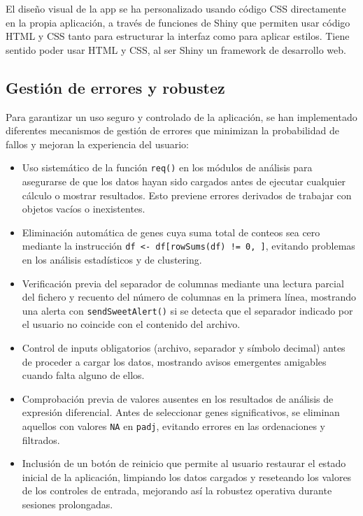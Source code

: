El diseño visual de la app se ha personalizado usando código CSS directamente en la propia aplicación, a
través de funciones de Shiny que permiten usar código HTML y CSS tanto para estructurar la interfaz como para aplicar estilos. Tiene sentido 
poder usar HTML y CSS, al ser Shiny un framework de desarrollo web.


\subsection{Gestión de errores y robustez}

Para garantizar un uso seguro y controlado de la aplicación, se han implementado diferentes mecanismos de gestión de errores que minimizan 
la probabilidad de fallos y mejoran la experiencia del usuario:

\begin{itemize}
    \item Uso sistemático de la función \texttt{req()} en los módulos de análisis para asegurarse de que los datos hayan sido cargados 
    antes de ejecutar cualquier cálculo o mostrar resultados. Esto previene errores derivados de trabajar con objetos vacíos o inexistentes.
    
    \item Eliminación automática de genes cuya suma total de conteos sea cero mediante la instrucción \texttt{df <- df[rowSums(df) != 0, ]}, 
    evitando problemas en los análisis estadísticos y de clustering.
    
    \item Verificación previa del separador de columnas mediante una lectura parcial del fichero y recuento del número de columnas en la 
    primera línea, mostrando una alerta con \texttt{sendSweetAlert()} si se detecta que el separador indicado por el usuario no coincide 
    con el contenido del archivo.
    
    \item Control de inputs obligatorios (archivo, separador y símbolo decimal) antes de proceder a cargar los datos, mostrando avisos 
    emergentes amigables cuando falta alguno de ellos.
    
    \item Comprobación previa de valores ausentes en los resultados de análisis de expresión diferencial. Antes de seleccionar genes significativos, 
    se eliminan aquellos con valores \texttt{NA} en \texttt{padj}, evitando errores en las ordenaciones y filtrados.
    
    \item Inclusión de un botón de reinicio que permite al usuario restaurar el estado inicial de la aplicación, limpiando los datos cargados y 
    reseteando los valores de los controles de entrada, mejorando así la robustez operativa durante sesiones prolongadas.
    

\end{itemize}
